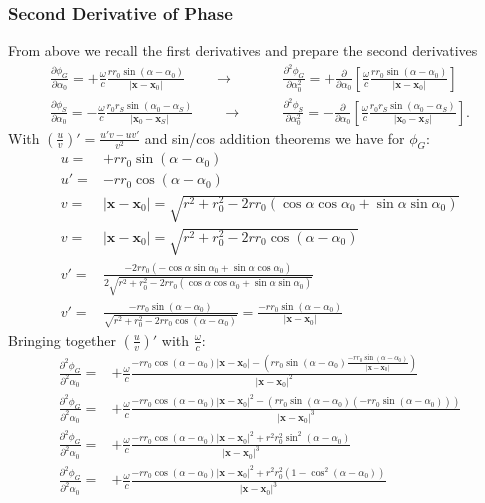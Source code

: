 \documentclass[a4paper,BCOR=15mm,10pt,twoside]{scrartcl}
\newcommand\wc{\frac{\omega}{c}}  %
\newcommand\azx{\alpha}  %
\renewcommand{\vec}[1]{\mathbf{#1}}  %
\begin{document}
\subsubsection{Second Derivative of Phase}
From above we recall the first derivatives and prepare the second derivatives
\begin{align}
\frac{\partial \phi_G}{\partial \azx_0} =+\wc \frac{r r_0 \sin(\azx-\azx_0)}{|\vec{x} -\vec{x}_0|}\qquad \rightarrow \qquad
&\frac{\partial^2 \phi_G}{\partial \azx_0^2} =+\frac{\partial }{\partial \azx_0} [ \wc \frac{r r_0 \sin(\azx-\azx_0)}{|\vec{x} -\vec{x}_0|} ] \\
\frac{\partial \phi_S}{\partial \azx_0} =-\wc \frac{r_0 r_S \sin(\azx_0 - \azx_S)}{|\vec{x}_0 - \vec{x}_S|} \qquad \rightarrow \qquad
&\frac{\partial^2 \phi_S}{\partial \azx_0^2} =-\frac{\partial}{\partial \azx_0} [ \wc \frac{r_0 r_S \sin(\azx_0 - \azx_S)}{|\vec{x}_0 - \vec{x}_S|} ].
\end{align}
With $(\frac{u}{v})' = \frac{u'v-uv'}{v^2}$ and sin/cos addition theorems we have for $\phi_G$:
\begin{align}
u =&  + r r_0 \sin(\azx-\azx_0)\\
u' =& - r r_0 \cos(\azx-\azx_0)\\
v =& |\vec{x} -\vec{x}_0| = \sqrt{r^2 + r_0^2 - 2 r r_0 (\cos\azx \cos\azx_0 + \sin\azx \sin\azx_0)}\\
v =& |\vec{x} -\vec{x}_0| = \sqrt{r^2 + r_0^2 - 2 r r_0 \cos(\azx - \azx_0)}\\
v' =& \frac{- 2 r r_0 (-\cos\azx \sin\azx_0 + \sin\azx \cos\azx_0)}{2\sqrt{r^2 + r_0^2 - 2 r r_0 (\cos\azx \cos\azx_0 + \sin\azx \sin\azx_0)}}\\
v' =& \frac{- r r_0 \sin(\azx-\azx_0)}{\sqrt{r^2 + r_0^2 - 2 r r_0 \cos(\azx-\azx_0)}} = \frac{- r r_0 \sin(\azx-\azx_0)}{|\vec{x} -\vec{x}_0|}
\end{align}
Bringing together $(\frac{u}{v})'$ with $\wc$:
\begin{align}
\frac{\partial^2 \phi_G}{\partial^2 \azx_0} =&+\wc \frac{
-r r_0 \cos(\azx-\azx_0) |\vec{x} -\vec{x}_0| -
(r r_0 \sin(\azx-\azx_0) \frac{- r r_0 \sin(\azx-\azx_0)}{|\vec{x} -\vec{x}_0|})
}
{|\vec{x} -\vec{x}_0|^2} \\
\frac{\partial^2 \phi_G}{\partial^2 \azx_0} =&+\wc \frac{
- r r_0 \cos(\azx-\azx_0) |\vec{x} -\vec{x}_0|^2-
(r r_0 \sin(\azx-\azx_0) (- r r_0 \sin(\azx-\azx_0))
)}
{|\vec{x} -\vec{x}_0|^3}\\
\frac{\partial^2 \phi_G}{\partial^2 \azx_0} =&+\wc \frac{
- r r_0 \cos(\azx-\azx_0) |\vec{x} -\vec{x}_0|^2 + 
r^2 r_0^2 \sin^2(\azx-\azx_0)
}
{|\vec{x} -\vec{x}_0|^3}\\
\frac{\partial^2 \phi_G}{\partial^2 \azx_0} =&+\wc \frac{
- r r_0 \cos(\azx-\azx_0) |\vec{x} -\vec{x}_0|^2 + 
r^2 r_0^2 (1-\cos^2(\azx-\azx_0))
}
{|\vec{x} -\vec{x}_0|^3}
\end{align}
\end{document}
